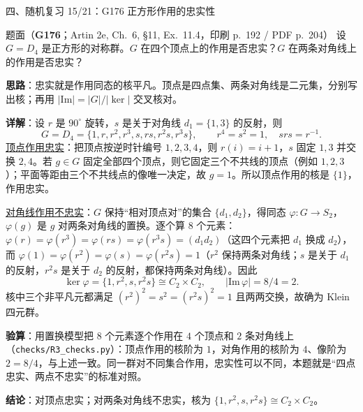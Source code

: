 \documentclass[aspectratio=169,10pt,fontset=none]{ctexbeamer}
\newcommand{\ex}[1]{\textcolor{accent}{\footnotesize\bfseries #1}}
\newcommand{\key}[1]{\textcolor{ink}{\bfseries #1}}
\begin{document}
\begin{frame}[t]{四、随机复习 15/21：G176 正方形作用的忠实性}
\label{ex:G176}
\scriptsize
\begin{block}{\footnotesize 题面（\ex{G176}；Artin 2e, Ch.~6, \S11, Ex.~11.4，印刷 p.~192 / PDF p.~204）}
设 $G=D_4$ 是正方形的对称群。$G$ 在四个顶点上的作用是否忠实？$G$ 在两条对角线上的作用是否忠实？
\end{block}
\key{思路}：忠实就是作用同态的核平凡。顶点是四点集、两条对角线是二元集，分别写出核；再用 $|\mathrm{Im}|=|G|/|\ker|$ 交叉核对。

\key{详解}：设 $r$ 是 $90^\circ$ 旋转，$s$ 是关于对角线 $d_1=\{1,3\}$ 的反射，则
\[ G=D_4=\{1,r,r^2,r^3,s,rs,r^2s,r^3s\},\qquad r^4=s^2=1,\quad srs=r^{-1}. \]
\underline{顶点作用忠实}：把顶点按逆时针编号 $1,2,3,4$，则 $r(i)=i+1$，$s$ 固定 $1,3$ 并交换 $2,4$。若 $g\in G$ 固定全部四个顶点，则它固定三个不共线的顶点（例如 $1,2,3$）；平面等距由三个不共线点的像唯一决定，故 $g=1$。所以顶点作用的核是 $\{1\}$，作用忠实。

\underline{对角线作用不忠实}：$G$ 保持“相对顶点对”的集合 $\{d_1,d_2\}$，得同态 $\varphi:G\to S_2$，$\varphi(g)$ 是 $g$ 对两条对角线的置换。逐个算 $8$ 个元素：$\varphi(r)=\varphi(r^3)=\varphi(rs)=\varphi(r^3s)=(d_1d_2)$（这四个元素把 $d_1$ 换成 $d_2$），而 $\varphi(1)=\varphi(r^2)=\varphi(s)=\varphi(r^2s)=1$（$r^2$ 保持两条对角线；$s$ 是关于 $d_1$ 的反射，$r^2s$ 是关于 $d_2$ 的反射，都保持两条对角线）。因此
\[ \ker\varphi=\{1,r^2,s,r^2s\}\cong C_2\times C_2,\qquad |\mathrm{Im}\,\varphi|=8/4=2. \]
核中三个非平凡元都满足 $(r^2)^2=s^2=(r^2s)^2=1$ 且两两交换，故确为 Klein 四元群。

\key{验算}：用置换模型把 $8$ 个元素逐个作用在 $4$ 个顶点和 $2$ 条对角线上（\texttt{checks/R3\_checks.py}）：顶点作用的核阶为 $1$，对角作用的核阶为 $4$、像阶为 $2=8/4$，与上述一致。同一群对不同集合作用，忠实性可以不同，本题就是“四点忠实、两点不忠实”的标准对照。

\key{结论}：对顶点忠实；对两条对角线不忠实，核为 $\{1,r^2,s,r^2s\}\cong C_2\times C_2$。
\end{frame}
\end{document}
